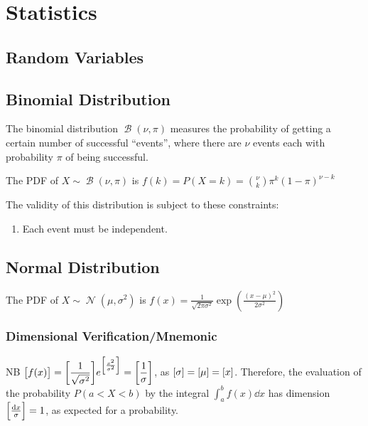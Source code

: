 \documentclass[a4paper,11pt]{article}
\DeclareMathOperator{\Normal}{\mathcal{N}}
\DeclareMathOperator{\Binomial}{\mathcal{B}}
\begin{document}
    \section{Statistics}

    \subsection{Random Variables}

    \subsection{Binomial Distribution}


    The binomial distribution $\Binomial(\nu, \pi)$ measures the probability of
    getting a certain number of successful ``events'', where there are $\nu$
    events each with probability $\pi$ of being successful.

    The PDF of $X \sim \Binomial(\nu, \pi)$ is
    $\displaystyle f(k) = P(X = k) = {\nu \choose k} \pi^k (1 - \pi)^{\nu - k}$

    The validity of this distribution is subject to these constraints:
    \begin{enumerate}
    \item Each event must be independent.
    \end{enumerate}

    \subsection{Normal Distribution}


    The PDF of $X \sim \Normal(\mu, \sigma^2)$ is
    $\displaystyle f(x) = \frac{1}{\sqrt{2\pi\sigma^2}}
                            \exp(\frac{(x - \mu)^2}{2\sigma^2})$

    \subsubsection{Dimensional Verification/Mnemonic}

    NB $\displaystyle\bqty{f(x)} =
        \bqty{\frac 1{\sqrt{\sigma^2}}}
        e^{\bqty{\frac{x^2}{\sigma^2}}}
      = \bqty{\frac 1\sigma}$, as
    $\bqty{\sigma} = \bqty{\mu} = \bqty{x}$. Therefore, the
    evaluation of the probability $P(a < X < b)$ by the integral
    $\displaystyle\int_a^bf(x) \dd{x}$ has dimension
    $\bqty{\frac{\dd{x}}{\sigma}} = 1$, as expected for a probability.
\end{document}
